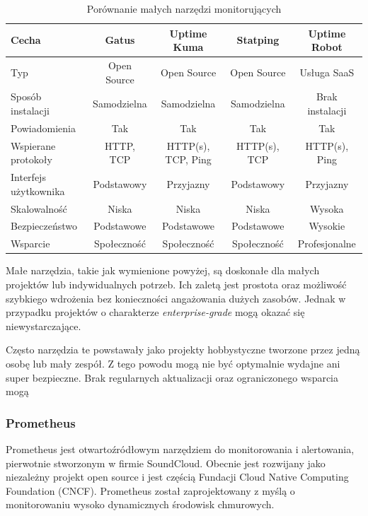\documentclass{article}
\begin{document}
\begin{table}[H]
    \centering
    \begin{tabular}{|l|c|c|c|c|}
        \hline
        \textbf{Cecha} & \textbf{Gatus} & \textbf{Uptime Kuma} & \textbf{Statping} & \textbf{Uptime Robot} \\ \hline
        Typ & Open Source & Open Source & Open Source & Usługa SaaS \\ \hline
        Sposób instalacji & Samodzielna & Samodzielna & Samodzielna & Brak instalacji \\ \hline
        Powiadomienia & Tak & Tak & Tak & Tak \\ \hline
        Wspierane protokoły & HTTP, TCP & HTTP(s), TCP, Ping & HTTP(s), TCP & HTTP(s), Ping \\ \hline
        Interfejs użytkownika & Podstawowy & Przyjazny & Podstawowy & Przyjazny \\ \hline
        Skalowalność & Niska & Niska & Niska & Wysoka \\ \hline
        Bezpieczeństwo & Podstawowe & Podstawowe & Podstawowe & Wysokie \\ \hline
        Wsparcie & Społeczność & Społeczność & Społeczność & Profesjonalne \\ \hline
    \end{tabular}
    \caption{Porównanie małych narzędzi monitorujących}
    \label{tab:porownanie-malych-narzedzi}
\end{table}

Małe narzędzia, takie jak wymienione powyżej, są doskonałe dla małych projektów lub indywidualnych potrzeb. Ich zaletą jest prostota oraz możliwość szybkiego wdrożenia bez konieczności angażowania dużych zasobów. Jednak w przypadku projektów o charakterze \textit{enterprise-grade} mogą okazać się niewystarczające.

Często narzędzia te powstawały jako projekty hobbystyczne tworzone przez jedną osobę lub mały zespół. Z tego powodu mogą nie być optymalnie wydajne ani super bezpieczne. Brak regularnych aktualizacji oraz ograniczonego wsparcia mogą 


\subsubsection{Prometheus}

Prometheus jest otwartoźródłowym narzędziem do monitorowania i alertowania, pierwotnie stworzonym w firmie SoundCloud. Obecnie jest rozwijany jako niezależny projekt open source i jest częścią Fundacji Cloud Native Computing Foundation (CNCF). Prometheus został zaprojektowany z myślą o monitorowaniu wysoko dynamicznych środowisk chmurowych.
\end{document}
